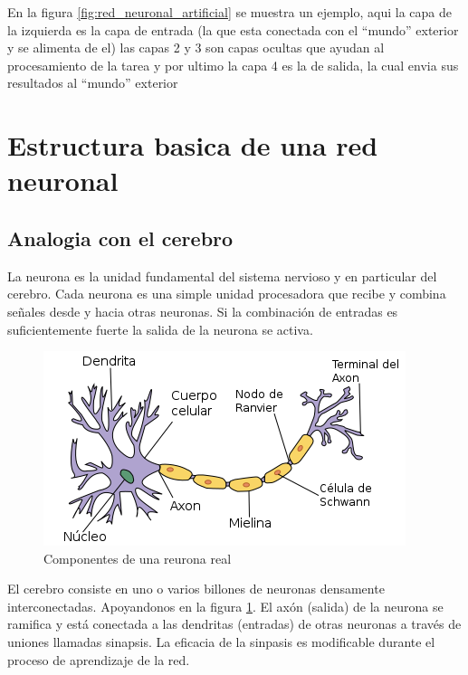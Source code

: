 \documentclass[runningheads]{llncs} %
\begin{document}
En la figura \ref{fig:red_neuronal_artificial} se muestra un ejemplo,
aqui la capa de la izquierda es la capa de entrada (la que esta
conectada con el \textquotedblleft{mundo}\textquotedblright{} exterior y se alimenta de el)
las capas 2 y 3 son capas ocultas que ayudan al procesamiento
de la tarea y por ultimo la capa 4 es la de salida, la cual
envia sus resultados al \textquotedblleft{mundo}\textquotedblright{} exterior

\section{Estructura basica de una red neuronal}
\subsection{Analogia con el cerebro}
La neurona es la unidad fundamental del sistema nervioso y en particular 
del cerebro. Cada neurona es una simple unidad procesadora que recibe y combina 
señales desde y hacia otras neuronas. 
Si la combinación de entradas es suficientemente fuerte la salida de la neurona
se activa. \cite{libro-def}

\begin{figure}
    \centering
    \includegraphics[scale=0.5]{neurona_real.png}
    \caption{Componentes de una reurona real \cite{img-neurona_real}}
    \label{fig:neurona_real}
\end{figure}

El cerebro consiste en uno o varios billones de neuronas densamente 
interconectadas. Apoyandonos en la figura \ref{fig:neurona_real}.
El axón (salida) de la neurona se ramifica y está conectada a las dendritas (entradas) 
de otras neuronas a través de uniones llamadas sinapsis.
La eficacia de la sinpasis es modificable durante el proceso de 
aprendizaje de la red. \cite{libro-def}
\end{document}
